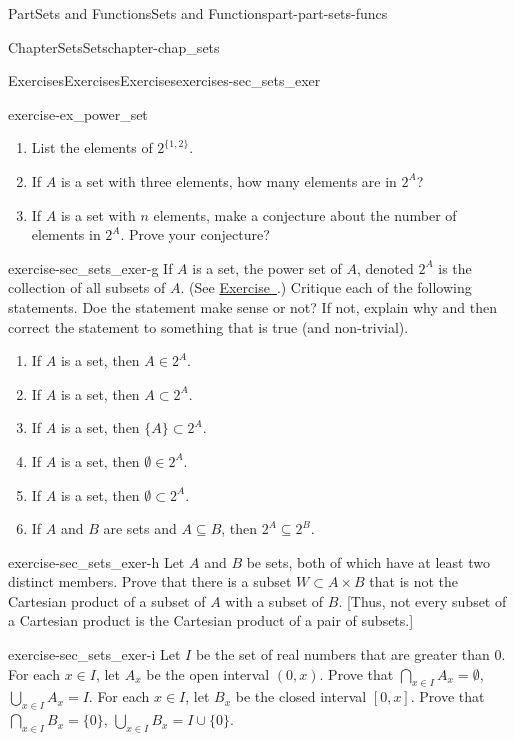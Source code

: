 \documentclass[oneside,10pt,]{book}
\newcommand{\xreffont}{\relax}
\numberwithin{equation}{chapter}
\newcommand{\ds}{\displaystyle}
\begin{document}
\begin{partptx}{Part}{Sets and Functions}{}{Sets and Functions}{}{}{part-part-sets-funcs}
\begin{chapterptx}{Chapter}{Sets}{}{Sets}{}{}{chapter-chap_sets}
\begin{exercises-section}{Exercises}{Exercises}{}{Exercises}{}{}{exercises-sec_sets_exer}
\begin{divisionexercise}{6}{}{}{exercise-ex_power_set}
\begin{enumerate}[font=\bfseries,label=(\alph*),ref=\alph*]%
\item{}List the elements of \(\ds 2^{\{1,2\}}\).%
\item{}If \(A\) is a set with three elements, how many elements are in \(2^A\)?%
\item{}If \(A\) is a set with \(n\) elements, make a conjecture about the number of elements in \(2^A\). Prove your conjecture?%
\end{enumerate}%
\end{divisionexercise}%
\begin{divisionexercise}{7}{}{}{exercise-sec_sets_exer-g}%
If \(A\) is a set, the power set of \(A\), denoted \(2^A\) is the collection of all subsets of \(A\). (See \hyperlink{exercise-ex_power_set}{Exercise~{\xreffont 6}}.) Critique each of the following statements. Doe the statement make sense or not? If not, explain why and then correct the statement to something that is true (and non-trivial).%
\begin{enumerate}[font=\bfseries,label=(\alph*),ref=\alph*]%
\item{}If \(A\) is a set, then \(A \in 2^A\).%
\item{}If \(A\) is a set, then \(A \subset 2^A\).%
\item{}If \(A\) is a set, then \(\{A\} \subset 2^A\).%
\item{}If \(A\) is a set, then \(\emptyset \in 2^A\).%
\item{}If \(A\) is a set, then \(\emptyset \subset 2^A\).%
\item{}If \(A\) and \(B\) are sets and \(A \subseteq B\), then \(2^A \subseteq 2^B\).%
\end{enumerate}%
\end{divisionexercise}%
\begin{divisionexercise}{8}{}{}{exercise-sec_sets_exer-h}%
Let \(A\) and \(B\) be sets, both of which have at least two distinct members. Prove that there is a subset \(W \subset A \times B\) that is not the Cartesian product of a subset of \(A\) with a subset of \(B\). [Thus, not every subset of a Cartesian product is the Cartesian product of a pair of subsets.]%
\end{divisionexercise}%
\begin{divisionexercise}{9}{}{}{exercise-sec_sets_exer-i}%
Let \(I\) be the set of real numbers that are greater than \(0\). For each \(x \in I\), let \(A_x\) be the open interval \((0,x)\). Prove that \(\bigcap_{x \in I} A_x = \emptyset\), \(\bigcup_{x \in I} A_x = I\). For each \(x \in I\), let \(B_x\) be the closed interval \([0,x]\). Prove that \(\bigcap_{x \in I} B_x = \{0\}\), \(\bigcup_{x \in I} B_x = I \cup \{0\}\).%

\end{divisionexercise}
\end{exercises-section}
\end{chapterptx}
\end{partptx}
\end{document}
